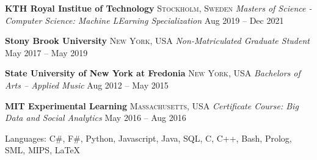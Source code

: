 \documentclass[10pt,letterpaper]{article}
\begin{document}
\headedsection 
{\textbf{KTH Royal Institue of Technology}}
{\textsc{Stockholm, Sweden}} {														
	\headedsubsection
	{\textit{Masters of Science - Computer Science: Machine LEarning Specialization}}
	{Aug 2019 -- Dec 2021}
	{\bodytext{}}
}
\vspace{-5mm}


\headedsection 
{\textbf{Stony Brook University}}
{\textsc{New York, USA}} {														
	\headedsubsection
	{\textit{Non-Matriculated Graduate Student}}
	{May 2017 -- May 2019}
	{\bodytext{}}
}
\vspace{-5mm}


\headedsection
{\textbf{State University of New York at Fredonia}}
{\textsc{New York, USA}} {															
	\headedsubsection
	{\textit{Bachelors of Arts -- Applied Music}}
	{Aug 2012 -- May 2015}
	{\bodytext{}}
}
\vspace{-5mm}


\headedsection 
{\textbf{MIT Experimental Learning}}
{\textsc{Massachusetts, USA}} {
	\headedsubsection 
	{\textit{Certificate Course: Big Data and Social Analytics}}
	{May 2016 -- Aug 2016}
	{\bodytext{}}
}



\spacedhrule{-0.6em}{-0.7em} 







										
\inlineheadsection 
{Languages:}
{C\#, F\#, Python, Javascript, Java, SQL, C, C++, Bash, Prolog, SML, MIPS, {\LaTeX}}
\vspace{0.5em}
										
										
\end{document}
